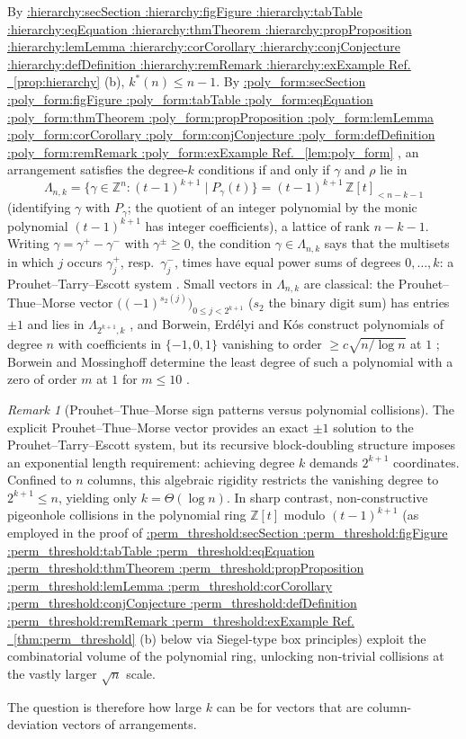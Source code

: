 \documentclass[11pt,a4paper]{article}
\makeatletter
\def\Cref@getprefix#1:#2\relax{#1}
\def\Cref@prefix@sec{sec}
\def\Cref@prefix@fig{fig}
\def\Cref@prefix@tab{tab}
\def\Cref@prefix@eq{eq}
\def\Cref@prefix@thm{thm}
\def\Cref@prefix@prop{prop}
\def\Cref@prefix@lem{lem}
\def\Cref@prefix@cor{cor}
\def\Cref@prefix@conj{conj}
\def\Cref@prefix@def{def}
\def\Cref@prefix@rem{rem}
\def\Cref@prefix@ex{ex}
\def\Cref@type@cap#1{%
  \edef\Cref@tmp{#1}%
  \ifx\Cref@tmp\Cref@prefix@sec Section%
  \else\ifx\Cref@tmp\Cref@prefix@fig Figure%
  \else\ifx\Cref@tmp\Cref@prefix@tab Table%
  \else\ifx\Cref@tmp\Cref@prefix@eq Equation%
  \else\ifx\Cref@tmp\Cref@prefix@thm Theorem%
  \else\ifx\Cref@tmp\Cref@prefix@prop Proposition%
  \else\ifx\Cref@tmp\Cref@prefix@lem Lemma%
  \else\ifx\Cref@tmp\Cref@prefix@cor Corollary%
  \else\ifx\Cref@tmp\Cref@prefix@conj Conjecture%
  \else\ifx\Cref@tmp\Cref@prefix@def Definition%
  \else\ifx\Cref@tmp\Cref@prefix@rem Remark%
  \else\ifx\Cref@tmp\Cref@prefix@ex Example%
  \else Ref.%
  \fi\fi\fi\fi\fi\fi\fi\fi\fi\fi\fi\fi
}
\DeclareRobustCommand{\Cref}[1]{%
  \begingroup
  \edef\Cref@label{#1}%
  \edef\Cref@prefix{\expandafter\Cref@getprefix\Cref@label:\relax}%
  \hyperref[#1]{\Cref@type@cap{\Cref@prefix}~\ref*{#1}}%
  \endgroup
}
\theoremstyle{plain}
\theoremstyle{definition}
\theoremstyle{remark}
\newtheorem{remark}[theorem]{Remark}
\newcommand{\Z}{\mathbb{Z}}
\makeatother
\begin{document}
By \Cref{prop:hierarchy}(b), $k^*(n)\le n-1$.
By \Cref{lem:poly_form}, an arrangement satisfies the degree-$k$ conditions if and only if $\gamma$ and $\rho$ lie in
\[
\Lambda_{n,k}=\{\gamma\in\Z^{n}:(t-1)^{k+1}\mid P_\gamma(t)\}=(t-1)^{k+1}\,\Z[t]_{<n-k-1}
\]
(identifying $\gamma$ with $P_\gamma$; the quotient of an integer polynomial by the monic polynomial $(t-1)^{k+1}$ has integer coefficients), a lattice of rank $n-k-1$.
Writing $\gamma=\gamma^+-\gamma^-$ with $\gamma^\pm\ge0$, the condition $\gamma\in\Lambda_{n,k}$ says that the multisets in which $j$ occurs $\gamma^+_j$, resp.\ $\gamma^-_j$, times have equal power sums of degrees $0,\dots,k$: a Prouhet--Tarry--Escott system \cite{wright1959prouhet,borwein2002computational}.
Small vectors in $\Lambda_{n,k}$ are classical: the Prouhet--Thue--Morse vector $\bigl((-1)^{s_2(j)}\bigr)_{0\le j<2^{k+1}}$ ($s_2$ the binary digit sum) has entries $\pm1$ and lies in $\Lambda_{2^{k+1},k}$ \cite{wright1959prouhet,allouche1999ubiquitous}, and Borwein, Erd\'elyi and K\'os construct polynomials of degree $n$ with coefficients in $\{-1,0,1\}$ vanishing to order $\ge c\sqrt{n/\log n}$ at $1$ \cite[Thm.~2.7]{BEK1999}; Borwein and Mossinghoff determine the least degree of such a polynomial with a zero of order $m$ at $1$ for $m\le10$ \cite{borwein2000height}.

\begin{remark}[Prouhet--Thue--Morse sign patterns versus polynomial collisions]
\label{rem:ptm_scale}
The explicit Prouhet--Thue--Morse vector provides an exact $\pm 1$ solution to the Prouhet--Tarry--Escott system, but its recursive block-doubling structure imposes an exponential length requirement: achieving degree $k$ demands $2^{k+1}$ coordinates. Confined to $n$ columns, this algebraic rigidity restricts the vanishing degree to $2^{k+1}\le n$, yielding only $k=\Theta(\log n)$. In sharp contrast, non-constructive pigeonhole collisions in the polynomial ring $\Z[t]$ modulo $(t-1)^{k+1}$ (as employed in the proof of \Cref{thm:perm_threshold}(b) below via Siegel-type box principles) exploit the combinatorial volume of the polynomial ring, unlocking non-trivial collisions at the vastly larger $\sqrt n$ scale.
\end{remark}

The question is therefore how large $k$ can be for vectors that are column-deviation vectors of arrangements.
\end{document}
